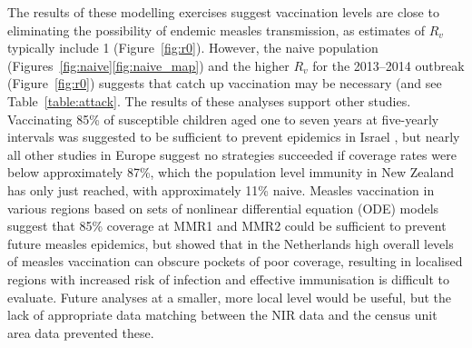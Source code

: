 \documentclass{article}
\begin{document}
The results of these modelling exercises suggest vaccination levels are close to eliminating the possibility of endemic measles transmission, as estimates of $R_v$ typically include 1 (Figure~\ref{fig:r0}). However, the naive population (Figures~\ref{fig:naive}\ref{fig:naive_map}) and the higher $R_v$ for the 2013--2014 outbreak (Figure~\ref{fig:r0}) suggests that catch up vaccination may be necessary (and see Table~\ref{table:attack}. The results of these analyses support other studies. Vaccinating 85\% of susceptible children aged one to seven years at five-yearly intervals was suggested to be sufficient to prevent epidemics in Israel \citep{agur93}, but nearly all other studies in Europe suggest no strategies succeeded if coverage rates were below approximately 87\%, which the population level immunity in New Zealand has only just reached, with approximately 11\% naive. Measles vaccination in various regions \citep{agur93, babad95, edmunds0, gay98, wallinga1} based on sets of nonlinear differential equation (ODE) models suggest that 85\% coverage at MMR1 and MMR2 could be sufficient to prevent future measles epidemics, but \citep{glass4} showed that in the Netherlands high overall levels of measles vaccination can obscure pockets of poor coverage, resulting in localised regions with increased risk of infection and effective immunisation is difficult to evaluate. Future analyses at a smaller, more local level would be useful, but the lack of appropriate data matching between the NIR data and the census unit area data prevented these.
\end{document}
